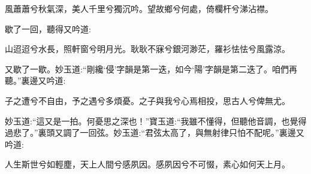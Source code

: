 \begin{poem}
    \begin{pl}
        風蕭蕭兮秋氣深，美人千里兮獨沉吟。望故鄉兮何處，倚欄杆兮涕沾襟。
    \end{pl}
\end{poem}


\begin{parag}
    歇了一回，聽得又吟道:
\end{parag}


\begin{poem}
    \begin{pl}
        山迢迢兮水長，照軒窗兮明月光。耿耿不寐兮銀河渺茫，羅衫怯怯兮風露涼。
    \end{pl}
\end{poem}


\begin{parag}
    又歇了一歇。妙玉道:“剛纔‘侵’字韻是第一迭，如今‘陽’字韻是第二迭了。咱們再聽。”裏邊又吟道:
\end{parag}

\begin{poem}
    \begin{pl}
        子之遭兮不自由，予之遇兮多煩憂。之子與我兮心焉相投，思古人兮俾無尤。
    \end{pl}
\end{poem}


\begin{parag}
    妙玉道:“這又是一拍。何憂思之深也！”寶玉道:“我雖不懂得，但聽他音調，也覺得過悲了。”裏頭又調了一回弦。妙玉道:“君弦太高了，與無射律只怕不配呢。”裏邊又吟道:
\end{parag}

\begin{poem}
    \begin{pl}
        人生斯世兮如輕塵，天上人間兮感夙因。感夙因兮不可惙，素心如何天上月。
    \end{pl}
\end{poem}


